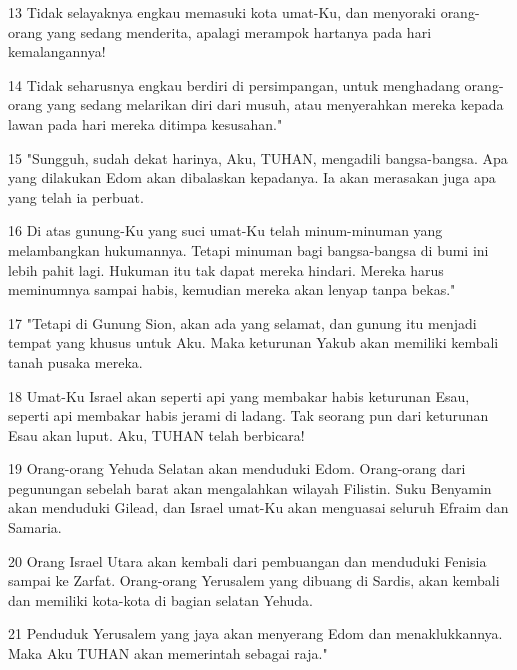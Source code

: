 \par 13 Tidak selayaknya engkau memasuki kota umat-Ku, dan menyoraki orang-orang yang sedang menderita, apalagi merampok hartanya pada hari kemalangannya!
\par 14 Tidak seharusnya engkau berdiri di persimpangan, untuk menghadang orang-orang yang sedang melarikan diri dari musuh, atau menyerahkan mereka kepada lawan pada hari mereka ditimpa kesusahan."
\par 15 "Sungguh, sudah dekat harinya, Aku, TUHAN, mengadili bangsa-bangsa. Apa yang dilakukan Edom akan dibalaskan kepadanya. Ia akan merasakan juga apa yang telah ia perbuat.
\par 16 Di atas gunung-Ku yang suci umat-Ku telah minum-minuman yang melambangkan hukumannya. Tetapi minuman bagi bangsa-bangsa di bumi ini lebih pahit lagi. Hukuman itu tak dapat mereka hindari. Mereka harus meminumnya sampai habis, kemudian mereka akan lenyap tanpa bekas."
\par 17 "Tetapi di Gunung Sion, akan ada yang selamat, dan gunung itu menjadi tempat yang khusus untuk Aku. Maka keturunan Yakub akan memiliki kembali tanah pusaka mereka.
\par 18 Umat-Ku Israel akan seperti api yang membakar habis keturunan Esau, seperti api membakar habis jerami di ladang. Tak seorang pun dari keturunan Esau akan luput. Aku, TUHAN telah berbicara!
\par 19 Orang-orang Yehuda Selatan akan menduduki Edom. Orang-orang dari pegunungan sebelah barat akan mengalahkan wilayah Filistin. Suku Benyamin akan menduduki Gilead, dan Israel umat-Ku akan menguasai seluruh Efraim dan Samaria.
\par 20 Orang Israel Utara akan kembali dari pembuangan dan menduduki Fenisia sampai ke Zarfat. Orang-orang Yerusalem yang dibuang di Sardis, akan kembali dan memiliki kota-kota di bagian selatan Yehuda.
\par 21 Penduduk Yerusalem yang jaya akan menyerang Edom dan menaklukkannya. Maka Aku TUHAN akan memerintah sebagai raja."


